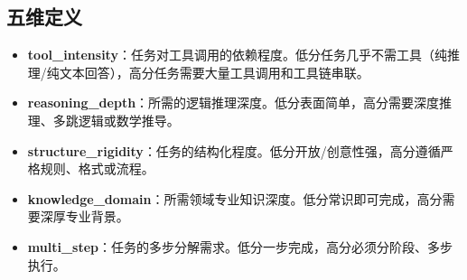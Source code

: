 \subsection*{五维定义}

\begin{itemize}
  \item \textbf{tool\_intensity}：任务对工具调用的依赖程度。低分任务几乎不需工具（纯推理/纯文本回答），高分任务需要大量工具调用和工具链串联。
  \item \textbf{reasoning\_depth}：所需的逻辑推理深度。低分表面简单，高分需要深度推理、多跳逻辑或数学推导。
  \item \textbf{structure\_rigidity}：任务的结构化程度。低分开放/创意性强，高分遵循严格规则、格式或流程。
  \item \textbf{knowledge\_domain}：所需领域专业知识深度。低分常识即可完成，高分需要深厚专业背景。
  \item \textbf{multi\_step}：任务的多步分解需求。低分一步完成，高分必须分阶段、多步执行。
\end{itemize}
